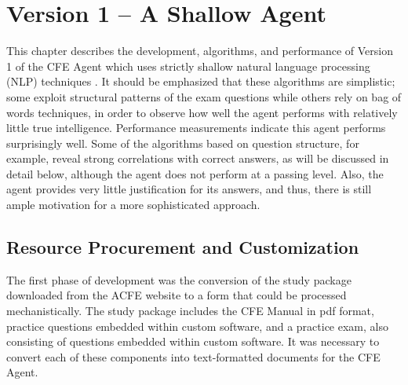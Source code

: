 
%

\chapter{Version 1 -- A Shallow Agent}


This chapter describes the development, algorithms, and performance of Version 1 of the CFE Agent which uses strictly shallow natural language processing (NLP) techniques \cite{martin_2000_speech_ch23}.  It should be emphasized that these algorithms are simplistic; some exploit structural patterns of the exam questions while others rely on bag of words techniques, in order to observe how well the agent performs with relatively little true intelligence.  Performance measurements indicate this agent performs surprisingly well.  Some of the algorithms based on question structure, for example, reveal strong correlations with correct answers, as will be discussed in detail below, although the agent does not perform at a passing level.  Also, the agent provides very little justification for its answers, and thus, there is still ample motivation for a more sophisticated approach.

\section{Resource Procurement and Customization}

The first phase of development was the conversion of the study package downloaded from the ACFE website to a form that could be processed mechanistically.  The study package includes the CFE Manual in pdf format, practice questions embedded within custom software, and a practice exam, also consisting of questions embedded within custom software.  It was necessary to convert each of these components into text-formatted documents for the CFE Agent.

